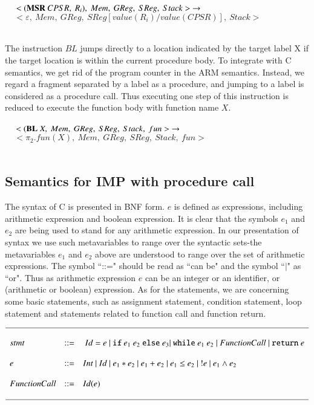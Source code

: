 \documentclass[conference]{IEEEtran}
\begin{document}
$~~~~~<(\textbf{MSR}~CPSR,~R_i),~Mem,~GReg,~SReg,~Stack>~\rightarrow\\ \\$
$~~~~~<\varepsilon,~Mem,~GReg,~SReg[value(R_i)/value(CPSR)],~Stack>$\\ \\
\par The instruction $BL$ jumps directly to a location indicated by the target label X if the target location is within the current procedure body. To integrate with C semantics, we get rid of the program counter in the ARM semantics. Instead, we regard a fragment separated by a label as a procedure, and jumping to a label is considered as a procedure call. Thus executing one step of this instruction is reduced to execute the function body with function name $X$.\\ \\
$~~~~~<(\textbf{BL}~X,~Mem,~GReg,~SReg,~Stack,~fun>~\rightarrow\\ \\$
$~~~~~<\pi_{2}.fun(X),~Mem,~GReg,~SReg,~Stack,~fun>$\\ \\
\subsection{Semantics for IMP with procedure call}

\par  The syntax of C is presented in BNF form. $e$ is defined as expressions, including arithmetic expression and boolean expression. It is clear that the symbols $e_1$ and $e_2$ are being used to stand for any arithmetic expression. In our presentation of syntax we use such metavariables to range over the syntactic sets-the metavariables $e_1$ and $e_2$ above are understood to range over the set of arithmetic expressions.  The symbol ``::=" should be read as ``can be" and the symbol ``$|$" as ``or". Thus as arithmetic expression $e$ can be an integer or an identifier, or (arithmetic or boolean) expression. As for the statements, we are concerning some basic statements, such as assignment statement, condition statement, loop statement and statements related to function call and function return.

\begin{math}
\small
\begin{array}{l l l}
\hline\\
stmt &::=&~Id=e ~|~ \texttt{if}~e_1~e_2~\texttt{else}~e_3 |~ \texttt{while}~e_1~e_2 ~|~ FunctionCall ~|~ \texttt{return}~e \\\\
e &::=&Int~|~Id~|~e_1*e_2~|~e_1+e_2~|~e_1\leq e_2~|~!e~|~e_1\land e_2\\\\
FunctionCall&::=&Id(e)\\\\

\hline

\end{array}
\end{math}
\end{document}
